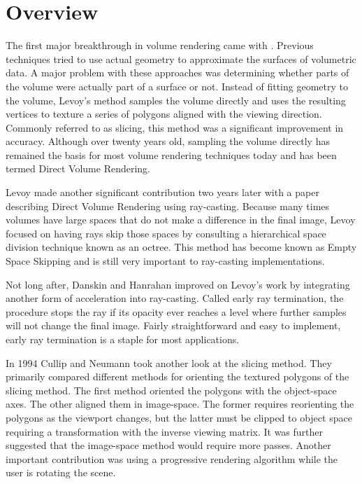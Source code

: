 \documentclass{report}
\begin{document}
\section{Overview}

The first major breakthrough in volume rendering came with \cite{Levoy88}.
Previous techniques tried to use actual geometry to approximate the surfaces of
volumetric data.  A major problem with these approaches was determining whether
parts of the volume were actually part of a surface or not.  Instead of fitting
geometry to the volume, Levoy’s method samples the volume directly and uses the
resulting vertices to texture a series of polygons aligned with the viewing
direction.  Commonly referred to as slicing, this method was a significant
improvement in accuracy.  Although over twenty years old, sampling the volume
directly has remained the basis for most volume rendering techniques today and
has been termed Direct Volume Rendering.

Levoy made another significant contribution two years later with a paper
\cite{Levoy90} describing Direct Volume Rendering using ray-casting.  Because
many times volumes have large spaces that do not make a difference in the final
image, Levoy focused on having rays skip those spaces by consulting a
hierarchical space division technique known as an octree.  This method has
become known as Empty Space Skipping and is still very important to ray-casting
implementations.

Not long after, Danskin and Hanrahan \cite{Danskin92} improved on Levoy’s work
by integrating another form of acceleration into ray-casting.  Called early ray
termination, the procedure stops the ray if its opacity ever reaches a level
where further samples will not change the final image.  Fairly straightforward
and easy to implement, early ray termination is a staple for most applications.

In 1994 Cullip and Neumann \cite{Cullip94} took another look at the slicing
method.  They primarily compared different methods for orienting the textured
polygons of the slicing method.  The first method oriented the polygons with the
object-space axes.  The other aligned them in image-space.  The former requires
reorienting the polygons as the viewport changes, but the latter must be clipped
to object space requiring a transformation with the inverse viewing matrix.  It
was further suggested that the image-space method would require more passes.
Another important contribution was using a progressive rendering algorithm while
the user is rotating the scene.
\end{document}
